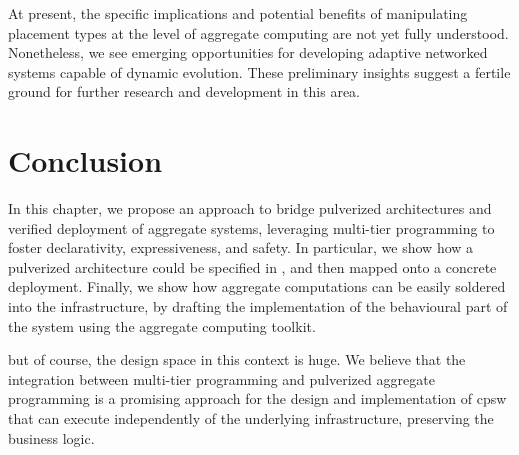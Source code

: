 At present, the specific implications and potential benefits of manipulating placement types at the level of aggregate computing are not yet fully understood. 
 Nonetheless, we see emerging opportunities for developing adaptive networked systems capable of dynamic evolution. 
 These preliminary insights suggest a fertile ground for further research and development in this area.

\section{Conclusion}
\label{conclusion}
In this chapter, we propose an approach 
 to bridge pulverized architectures 
 and verified deployment of aggregate systems,
leveraging multi-tier programming to foster 
 declarativity, expressiveness, and safety. 
%
In particular, we show how a pulverized architecture could be specified in \scalaloci{},
and then mapped onto a concrete deployment.
%
Finally, we show how aggregate computations can be easily soldered into the infrastructure,
by drafting the implementation of the behavioural part of the system using the \scafi{} aggregate computing toolkit.

but of course, the design space in this context is huge.
%
We believe that the integration between multi-tier programming and pulverized aggregate programming is a promising approach for the design and implementation of \ac{cpsw} that can execute independently of the underlying infrastructure,
preserving the business logic.
